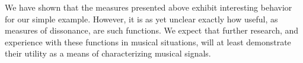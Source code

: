 We have shown that the measures presented above exhibit interesting
behavior for our simple example.  However, it is as yet unclear exactly how
useful, as measures of dissonance,  %
are such functions.  We expect that further research, and experience with
these functions in musical situations, will at least demonstrate their utility
as a means of characterizing musical signals.   


